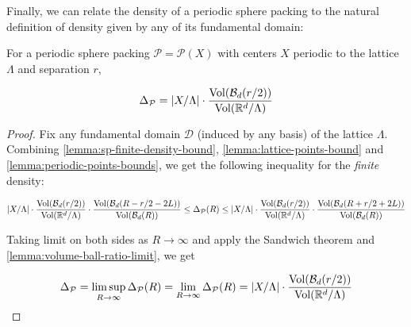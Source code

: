 Finally, we can relate the density of a periodic sphere packing to the natural definition of density given by any of its fundamental domain:

\begin{theorem}\label{theorem:psp-density}\leanok
  For a periodic sphere packing $\mathcal{P} = \mathcal{P}(X)$ with centers $X$ periodic to the lattice $\Lambda$ and separation $r$,

  \[
    \Delta_{\mathcal{P}} = |X / \Lambda| \cdot \frac{\operatorname{Vol}\!\left(\mathcal{B}_d(r / 2)\right)}{\operatorname{Vol}\!\left(\mathbb{R}^d / \Lambda\right)}
  \]
\end{theorem}
\begin{proof}\leanok
  Fix any fundamental domain $\mathcal{D}$ (induced by any basis) of the lattice $\Lambda$. Combining \cref{lemma:sp-finite-density-bound}, \cref{lemma:lattice-points-bound} and \cref{lemma:periodic-points-bounds}, we get the following inequality for the \textit{finite} density:

  \[
    |X / \Lambda| \cdot \frac{\Vol{\mathcal{B}_d(r / 2)}}{\Vol{\R^d / \Lambda}} \cdot \frac{\Vol{\mathcal{B}_d(R - r / 2 - 2L)}}{\Vol{\mathcal{B}_d(R)}}
    \leq \Delta_{\mathcal{P}}(R)
    \leq |X / \Lambda| \cdot \frac{\Vol{\mathcal{B}_d(r / 2)}}{\Vol{\R^d / \Lambda}} \cdot \frac{\Vol{\mathcal{B}_d(R + r / 2 + 2L)}}{\Vol{\mathcal{B}_d(R)}}
  \]

  Taking limit on both sides as $R \to \infty$ and apply the Sandwich theorem and \cref{lemma:volume-ball-ratio-limit}, we get

  \[
    \Delta_{\mathcal{P}} = \limsup_{R \to \infty} \Delta_{\mathcal{P}}(R) = \lim_{R \to \infty} \Delta_{\mathcal{P}}(R) = |X / \Lambda| \cdot \frac{\operatorname{Vol}\!\left(\mathcal{B}_d(r / 2)\right)}{\operatorname{Vol}\!\left(\mathbb{R}^d / \Lambda\right)}
  \]
\end{proof}
